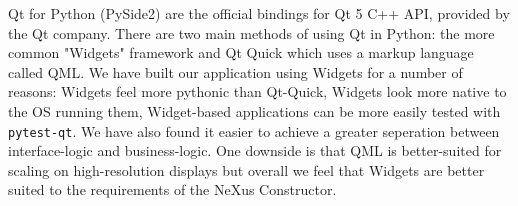 Qt for Python (PySide2) are the official bindings for Qt 5 C++ API, provided by the Qt company. There are two main methods of using Qt in Python: the more common "Widgets" framework and Qt Quick which uses a markup language called QML. We have built our application using Widgets for a number of reasons: Widgets feel more pythonic than Qt-Quick, Widgets look more native to the OS running them, Widget-based applications can be more easily tested with \texttt{pytest-qt}. We have also found it easier to achieve a greater seperation between interface-logic and business-logic. One downside is that QML is better-suited for scaling on high-resolution displays but overall we feel that Widgets are better suited to the requirements of the NeXus Constructor.
\bigskip

\iffalse
The code snippet below shows the usage of a typical Qt3D view in python. Qt3D provides some high-level geometry types for adding cylinders, meshes, spheres as well as several other shapes. This is all wrapping OpenGL, and in the future Qt have stated they will support other graphics engines such as DirectX12, Vulkan and Metal. Currently there is some limited support for vulkan using the QVulkanWindow with a QVulkanInstance.
\fi
